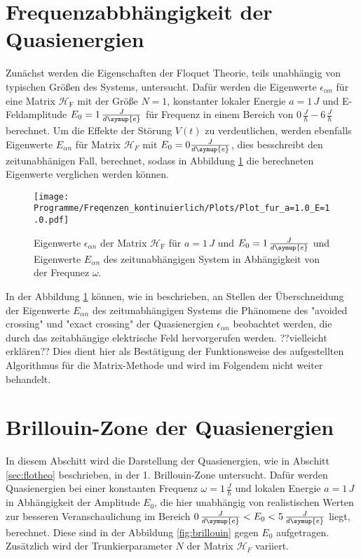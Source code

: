 \section{Frequenzabbhängigkeit der Quasienergien}
Zunächst werden die Eigenschaften der Floquet Theorie,
teils unabhängig von typischen Größen des Systems, untersucht. Dafür
werden die Eigenwerte
 $\epsilon_{\alpha n}$ für eine
Matrix $\mathcal{H}_\mathrm{F}$ mit der
Größe $N=1$,  konstanter lokaler Energie $a=1\,J$
und E-Feldamplitude $E_0=1\,\frac{J}{d\symup{e}}$
für Frequenz in einem Bereich von $0\,\frac{J}{\hbar}-6\,\frac{J}{\hbar}$  berechnet.
Um die Effekte der Störung $V(t)$ zu verdeutlichen,
werden ebenfalls Eigenwerte $E_{\alpha n}$ für Matrix $\mathcal{H}_F$ mit $E_0=0\frac{J}{d\symup{e}}$, dies besschreibt den
zeitunabhänigen Fall, berechnet, sodass in Abbildung \ref{fig:epsilon_f}
die berechneten Eigenwerte verglichen werden können.
\begin{figure}
   \centering
   \texttt{[image: Programme/Freqenzen\_kontinuierlich/Plots/Plot\_fur\_a=1.0\_E=1.0.pdf]}
   \caption{Eigenwerte $\epsilon_{\alpha n}$ der Matrix $\mathcal{H}_\mathrm{F}$ für $a=1\,J$ und $E_0=1\,\frac{J}{d\symup{e}}$ und
   Eigenwerte $E_{\alpha n}$ des zeitunabhängigen System in Abhängigkeit von der Frequnez $\omega$.}
   \label{fig:epsilon_f}
\end{figure}
In der Abbildung \ref{fig:epsilon_f} können, wie in \cite{haenggi} beschrieben, an Stellen der Überschneidung der Eigenwerte  $E_{\alpha n}$
des zeitunabhängigen Systems die Phänomene des "avoided crossing" und
"exact crossing" der Quasienergien $\epsilon_{\alpha n}$ beobachtet werden,
die durch das zeitabhängige elektrische Feld hervorgerufen werden.
??vielleicht erklären??
Dies dient hier als Bestätigung der Funktionsweise
des aufgestellten Algorithmus für die Matrix-Methode und wird im Folgendem nicht weiter behandelt.

\section{Brillouin-Zone der Quasienergien}
In diesem Abschitt wird die Darstellung der Quasienergien, wie in
Abschitt \ref{sec:flotheo} beschrieben, in der 1.
Brillouin-Zone untersucht.
Dafür werden Quasienergien bei einer konstanten Frequenz $\omega=1\,\frac{J}{\hbar}$ und
lokalen Energie $a=1\,J$ in Abhängigkeit der
Amplitude $E_0$, die hier unabhängig
von realistischen Werten zur besseren Veranschaulichung im
Bereich $0\,\frac{J}{d\symup{e}}<E_0<5\,\frac{J}{d\symup{e}}$ liegt, berechnet.
Diese sind in der Abbildung \ref{fig:brillouin} gegen $E_0$ aufgetragen.
Zusätzlich wird der Trunkierparameter $N$ der Matrix $\mathcal{H}_F$ variiert.

